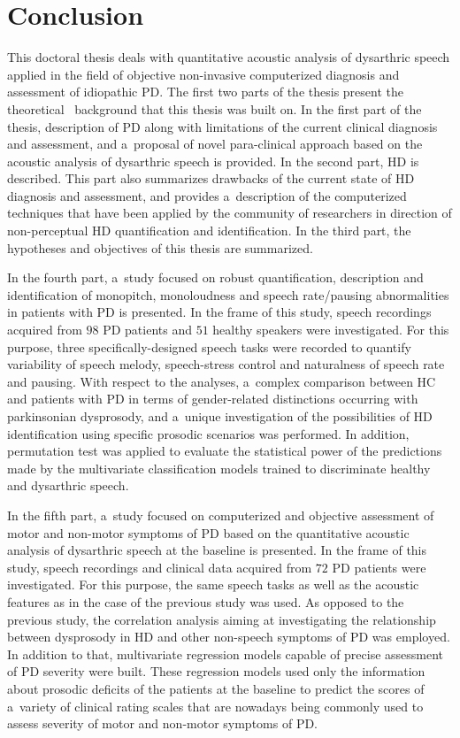 \chapter[Conclusion]{Conclusion}
\label{ch8}

This doctoral thesis deals with quantitative acoustic analysis of dysarthric speech applied in the field of objective non-invasive computerized diagnosis and assessment of idiopathic PD. The first two parts of the thesis present the theoretical ~background that this thesis was built on. In the first part of the thesis, description of PD along with limitations of the current clinical diagnosis and assessment, and a~proposal of novel para-clinical approach based on the acoustic analysis of dysarthric speech is provided. In the second part, HD is described. This part also summarizes drawbacks of the current state of HD diagnosis and assessment, and provides a~description of the computerized techniques that have been applied by the community of researchers in direction of non-perceptual HD quantification and identification. In the third part, the hypotheses and objectives of this thesis are summarized. 

In the fourth part, a~study focused on robust quantification, description and identification of monopitch, monoloudness and speech rate/pausing abnormalities in patients with PD is presented. In the frame of this study, speech recordings acquired from $98$ PD patients and $51$ healthy speakers were investigated. For this purpose, three specifically-designed speech tasks were recorded to quantify variability of speech melody, speech-stress control and naturalness of speech rate and pausing. With respect to the analyses, a~complex comparison between HC and patients with PD in terms of gender-related distinctions occurring with parkinsonian dysprosody, and a~unique investigation of the possibilities of HD identification using specific prosodic scenarios was performed. In addition, permutation test was applied to evaluate the statistical power of the predictions made by the multivariate classification models trained to discriminate healthy and dysarthric speech.

In the fifth part, a~study focused on computerized and objective assessment of motor and non-motor symptoms of PD based on the quantitative acoustic analysis of dysarthric speech at the baseline is presented. In the frame of this study, speech recordings and clinical data acquired from $72$ PD patients were investigated. For this purpose, the same speech tasks as well as the acoustic features as in the case of the previous study was used. As opposed to the previous study, the correlation analysis aiming at investigating the relationship between dysprosody in HD and other non-speech symptoms of PD was employed. In addition to that, multivariate regression models capable of precise assessment of PD severity were built. These regression models used only the information about prosodic deficits of the patients at the baseline to predict the scores of a~variety of clinical rating scales that are nowadays being commonly used to assess severity of motor and non-motor symptoms of PD.

